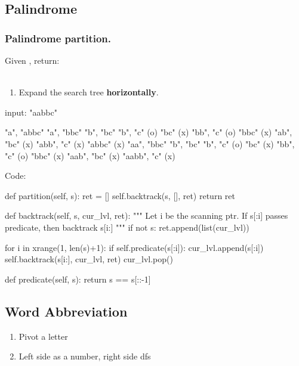 \subsection{Palindrome}
\subsubsection{Palindrome partition.} Given , return: \\
\pyinline{[["aa","b"], ["a","a","b"]]}
\\
\begin{enumerate}
\item Expand the search tree \textbf{horizontally}.
\end{enumerate}
\begin{python}
input: "aabbc"

"a", "abbc"
     "a", "bbc"
          "b", "bc"
               "b", "c" (o)
               "bc" (x)
          "bb", "c" (o)
          "bbc" (x)
     "ab", "bc" (x)
     "abb", "c" (x)
     "abbc" (x)
"aa", "bbc"
      "b", "bc"
           "b", "c" (o)
           "bc" (x)
      "bb", "c" (o)
      "bbc" (x)
"aab", "bc" (x)
"aabb", "c" (x)
\end{python}
Code:

\begin{python}
def partition(self, s):
    ret = []
    self.backtrack(s, [], ret)
    return ret

def backtrack(self, s, cur_lvl, ret):
    """
    Let i be the scanning ptr.
    If s[:i] passes predicate, then backtrack s[i:]
    """
    if not s:
        ret.append(list(cur_lvl))

    for i in xrange(1, len(s)+1):
        if self.predicate(s[:i]):
            cur_lvl.append(s[:i])
            self.backtrack(s[i:], cur_lvl, ret)
            cur_lvl.pop()

def predicate(self, s):
    return s == s[::-1]
\end{python}

\subsection{Word Abbreviation}
\begin{enumerate}
\item Pivot a letter
\item Left side as a number, right side dfs 
\end{enumerate}

